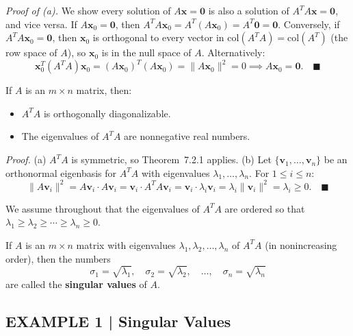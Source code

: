 \documentclass{article}
\begin{document}
\textit{Proof of (a).} We show every solution of $A\mathbf{x}=\mathbf{0}$ is also a
solution of $A^TA\mathbf{x}=\mathbf{0}$, and vice versa. If $A\mathbf{x}_0=\mathbf{0}$,
then $A^TA\mathbf{x}_0 = A^T(A\mathbf{x}_0) = A^T\mathbf{0} = \mathbf{0}$. Conversely,
if $A^TA\mathbf{x}_0=\mathbf{0}$, then $\mathbf{x}_0$ is orthogonal to every vector in
$\mathrm{col}(A^TA) = \mathrm{col}(A^T)$ (the row space of $A$), so $\mathbf{x}_0$ is
in the null space of $A$. Alternatively:
\[
  \mathbf{x}_0^T(A^TA)\mathbf{x}_0 = (A\mathbf{x}_0)^T(A\mathbf{x}_0)
  = \|A\mathbf{x}_0\|^2 = 0 \implies A\mathbf{x}_0 = \mathbf{0}.\quad\blacksquare
\]

\begin{tcolorbox}[colback=red!4, colframe=red!60!black,
  title={\textbf{Theorem 9.4.2}}, boxrule=0.5mm, arc=3mm]
If $A$ is an $m\times n$ matrix, then:
\begin{itemize}
  \item[(a)] $A^TA$ is orthogonally diagonalizable.
  \item[(b)] The eigenvalues of $A^TA$ are nonneg\-ative real numbers.
\end{itemize}
\end{tcolorbox}

\textit{Proof.} (a) $A^TA$ is symmetric, so Theorem~7.2.1 applies. (b) Let
$\{\mathbf{v}_1,\ldots,\mathbf{v}_n\}$ be an orthonormal eigenbasis for $A^TA$ with
eigenvalues $\lambda_1,\ldots,\lambda_n$. For $1\le i\le n$:
\[
  \|A\mathbf{v}_i\|^2 = A\mathbf{v}_i\cdot A\mathbf{v}_i
  = \mathbf{v}_i\cdot A^TA\mathbf{v}_i
  = \mathbf{v}_i\cdot\lambda_i\mathbf{v}_i = \lambda_i\|\mathbf{v}_i\|^2 = \lambda_i \ge 0.
  \quad\blacksquare
\]

We assume throughout that the eigenvalues of $A^TA$ are ordered so that
$\lambda_1\ge\lambda_2\ge\cdots\ge\lambda_n\ge 0$.

\begin{tcolorbox}[colback=teal!4, colframe=teal!65!black,
  title={\textbf{Definition 1}}, boxrule=0.5mm, arc=3mm]
If $A$ is an $m\times n$ matrix with eigenvalues $\lambda_1,\lambda_2,\ldots,\lambda_n$
of $A^TA$ (in nonincreasing order), then the numbers
\[
  \sigma_1 = \sqrt{\lambda_1},\quad \sigma_2 = \sqrt{\lambda_2},\quad\ldots,\quad
  \sigma_n = \sqrt{\lambda_n}
\]
are called the \textbf{singular values} of $A$.
\end{tcolorbox}

\subsection*{EXAMPLE 1 | Singular Values}
\end{document}
